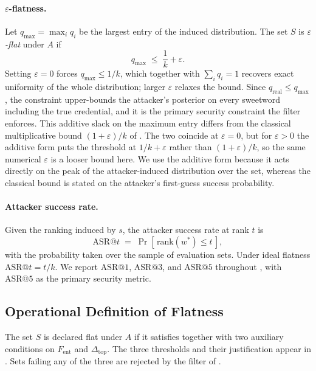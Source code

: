 \paragraph{$\varepsilon$-flatness.}
Let $q_{\max} = \max_i q_i$ be the largest entry of the induced
distribution. The set $S$ is \emph{$\varepsilon$-flat} under $A$ if
%
\begin{equation}
q_{\max} \;\le\; \frac{1}{k} + \varepsilon.
\label{eq:eps-flat}
\end{equation}
%
Setting $\varepsilon = 0$ forces $q_{\max} \le 1/k$, which together with
$\sum_i q_i = 1$ recovers exact uniformity of the whole distribution;
larger $\varepsilon$ relaxes the bound. Since $q_{\text{real}} \le
q_{\max}$, the constraint upper-bounds the attacker's posterior on every
sweetword including the true credential, and it is the primary security
constraint the filter enforces. This additive slack on the maximum entry
differs from the classical multiplicative bound $(1+\varepsilon)/k$ of
. The two coincide at $\varepsilon = 0$, but for
$\varepsilon > 0$ the additive form puts the threshold at
$1/k + \varepsilon$ rather than $(1+\varepsilon)/k$, so the same
numerical $\varepsilon$ is a looser bound here. We use the additive form
because it acts directly on the peak of the attacker-induced
distribution over the set, whereas the classical bound is stated on the
attacker's first-guess success probability.

\paragraph{Attacker success rate.}
Given the ranking induced by $s$, the attacker success rate at rank $t$
is
%
\begin{equation}
\mathrm{ASR}@t \;=\; \Pr\!\left[\, \text{rank}(w^{*}) \le t \,\right],
\end{equation}
%
with the probability taken over the sample of evaluation sets. Under
ideal flatness $\mathrm{ASR}@t = t/k$. We report $\mathrm{ASR}@1$,
$\mathrm{ASR}@3$, and $\mathrm{ASR}@5$ throughout ,
with $\mathrm{ASR}@5$ as the primary security metric.

\subsection{Operational Definition of Flatness}

The set $S$ is declared flat under $A$ if it satisfies
 together with two auxiliary conditions on
$F_{\text{ent}}$ and $\Delta_{\text{top}}$. The three thresholds and
their justification appear in . Sets failing
any of the three are rejected by the filter of
.

